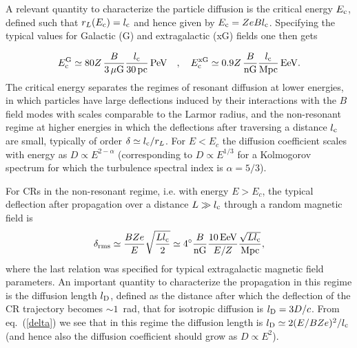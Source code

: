 \documentclass[twoside,12pt]{article}
\begin{document}
A relevant quantity to characterize the particle diffusion is the critical energy $E_{\rm c}$, defined such that $r_L(E_{\rm c})=l_{\rm c}$ and hence given by $E_{\rm c}=Z e B l_{\rm c}$. Specifying the typical values for Galactic (G) and extragalactic (xG) fields one then gets

\begin{equation}
E_{\rm c}^{\rm G} \simeq 80 Z\,\frac{B}{3\,\mu{\rm G}}\frac{l_{\rm c}}{30\,\rm pc}\,{\rm PeV}\ \ \ ,\ \ \ E_{\rm c}^{\rm xG} \simeq 0.9 Z\,\frac{B}{\rm nG}\frac{l_{\rm c}}{\rm Mpc}\,{\rm EeV}.
\label{ec}
\end{equation}
The critical energy separates the regimes of resonant diffusion at lower energies, in which particles have large deflections induced by their interactions with the $B$ field modes with scales comparable to the Larmor radius, and the non-resonant regime at higher energies in which the deflections after traversing a distance $l_{\rm c}$ are small, typically of order $\delta\simeq l_{\rm c}/r_L$. 
For $E<E_c$ the diffusion coefficient scales with energy as $D\propto E^{2-\alpha}$ (corresponding to $D\propto E^{1/3}$ for a Kolmogorov spectrum for which the turbulence spectral index is $\alpha=5/3$).

For CRs in the non-resonant regime, i.e. with energy $E > E_c$, the typical deflection  after propagation over a distance $L\gg l_{\rm c}$ through a random magnetic field is \cite{ac99,hmrs}
\begin{equation}
\delta_{\rm rms}\simeq \frac{BZe}{E}\sqrt{\frac{Ll_{\rm c}}{2}}\simeq 4^\circ \frac{B}{\rm nG}\frac{\rm 10\,EeV}{E/Z}\frac{\sqrt{Ll_{\rm c}}}{\rm Mpc},
\label{delta}
\end{equation}
where the last relation was specified for typical extragalactic magnetic field parameters. 
An important quantity to characterize the propagation in this regime is the diffusion length $l_{\rm D}$, defined as the distance after which the deflection of the CR trajectory becomes $\sim 1$~rad, that for isotropic diffusion is $l_{\rm D} = 3D/c$. From eq.~(\ref{delta}) we see that in this regime the diffusion length is $l_{\rm D} \simeq 2(E/BZe)^2/l_{\rm c}$ (and hence also the diffusion coefficient should grow as $D\propto E^2$). 
\end{document}

